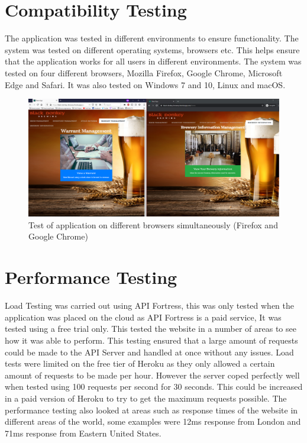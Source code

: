 \section{Compatibility Testing}
The application was tested in different environments to ensure functionality. The system was tested on different operating systems, browsers etc. This helps ensure that the application works for all users in different environments. The system was tested on four different browsers, Mozilla Firefox, Google Chrome, Microsoft Edge and Safari. It was also tested on Windows 7 and 10, Linux and macOS.
\begin{figure}[h!]
 	\caption{Test of application on different browsers simultaneously (Firefox and Google Chrome)}
	\label{image:browsertest}
 	\centering
 	\includegraphics[width=1.0\textwidth]{Images/browser test.PNG}
\end{figure}
\newpage

\section{Performance Testing}
Load Testing was carried out using API Fortress, this was only tested when the application was placed on the cloud as API Fortress is a paid service, It was tested using a free trial only. This tested the website in a number of areas to see how it was able to perform. This testing ensured that a large amount of requests could be made to the API Server and handled at once without any issues. Load tests were limited on the free tier of Heroku as they only allowed a certain amount of requests to be made per hour. However the server coped perfectly well when tested using 100 requests per second for 30 seconds. This could be increased in a paid version of Heroku to try to get the maximum requests possible. The performance testing also looked at areas such as response times of the website in different areas of the world, some examples were 12ms response from London and 71ms response from Eastern United States.

